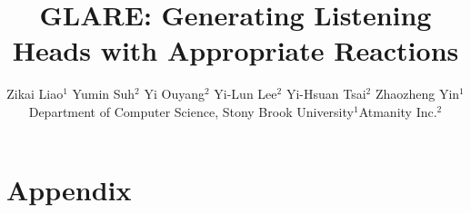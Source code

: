 \documentclass{article}
\title{GLARE: Generating Listening Heads with Appropriate Reactions}
\author{%
  Zikai Liao$^{1}$ \hspace{1mm} Yumin Suh$^{2}$ \hspace{1mm} Yi Ouyang$^{2}$ \hspace{1mm} Yi-Lun Lee$^{2}$ \hspace{1mm} Yi-Hsuan Tsai$^{2}$ \hspace{1mm} Zhaozheng Yin$^{1}$ \\
  Department of Computer Science, Stony Brook University$^{1}$\hspace{2em}Atmanity Inc.$^{2}$\\
}
\begin{document}
\maketitle










{
\small


}



\clearpage
\newpage
\appendix
\section*{\textbf{\LARGE Appendix}}







% 
\end{document}
